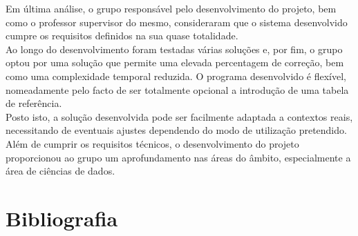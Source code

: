 \documentclass[a4paper,12pt]{article}
\begin{document}
Em última análise, o grupo responsável pelo desenvolvimento do projeto, bem como o professor supervisor do mesmo, consideraram que o sistema desenvolvido cumpre os requisitos definidos na sua quase totalidade.
\\
Ao longo do desenvolvimento foram testadas várias soluções e, por fim, o grupo optou por uma solução que permite uma elevada percentagem de correção, bem como uma complexidade temporal reduzida.
O programa desenvolvido é flexível, nomeadamente pelo facto de ser totalmente opcional a introdução de uma tabela de referência.
\\
Posto isto, a solução desenvolvida pode ser facilmente adaptada a contextos reais, necessitando de eventuais ajustes dependendo do modo de utilização pretendido.
Além de cumprir os requisitos técnicos, o desenvolvimento do projeto proporcionou ao grupo um aprofundamento nas áreas do âmbito, especialmente a área de ciências de dados.

\newpage
\section{Bibliografia}


\end{document}
